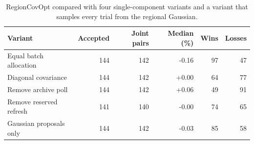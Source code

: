 \begin{table}[htbp]\centering\small\caption{RegionCovOpt compared with four single-component variants and a variant that samples every trial from the regional Gaussian.}\begin{tabular}{lrrrrr}\toprule
Variant & Accepted & Joint pairs & Median (\%) & Wins & Losses\\\midrule
Equal batch allocation & 144 & 142 & -0.16 & 97 & 47\\
Diagonal covariance & 144 & 142 & +0.00 & 64 & 77\\
Remove archive poll & 144 & 142 & +0.06 & 49 & 91\\
Remove reserved refresh & 141 & 140 & -0.00 & 74 & 65\\
Gaussian proposals only & 144 & 142 & -0.03 & 85 & 58\\
\bottomrule\end{tabular}\end{table}
